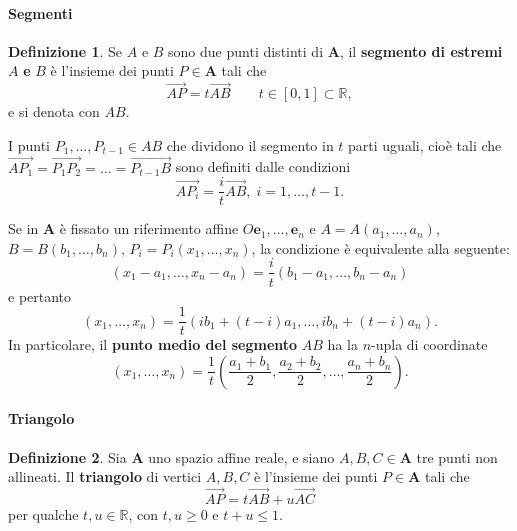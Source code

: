 \documentclass{article}
\theoremstyle{plain}
\theoremstyle{definition}
\newtheorem{defn}{Definizione}[section]
\theoremstyle{remark}
\begin{document}
\vspace{10pt}

\paragraph{Segmenti}
\begin{bxthm}
\begin{defn}
    Se $A$ e $B$ sono due punti distinti di $\mathbf{A}$, il \textbf{segmento di estremi} $A$ \textbf{e} $B$ è l'insieme dei punti $P\in \mathbf{A}$ tali che 
    \[\overrightarrow{AP}=t\overrightarrow{AB}\quad\quad t\in[0,1]\subset\mathbb{R},\]
    e si denota con $AB$.
\end{defn}
\end{bxthm}

\vspace{10pt}

I punti $P_1,\ldots,P_{t-1}\in AB$ che dividono il segmento in $t$ parti uguali, cioè tali che $\overrightarrow{AP_1}=\overrightarrow{P_1P_2}=\ldots=\overrightarrow{P_{t-1}B}$ sono definiti dalle condizioni
\[\overrightarrow{AP_i}=\frac{i}{t}\overrightarrow{AB},\;i=1,\ldots,t-1.\]

\vspace{10pt}

Se in $\mathbf{A}$ è fissato un riferimento affine $O\mathbf{e}_1,\ldots,\mathbf{e}_n$ e $A=A(a_1,\ldots,a_n)$, $B=B(b_1,\ldots,b_n)$, $P_i=P_i(x_1,\ldots,x_n)$, la condizione 
è equivalente alla seguente: \[(x_1-a_1,\ldots,x_n-a_n)=\frac{i}{t}(b_1-a_1,\ldots,b_n-a_n)\] e pertanto 
\[(x_1,\ldots,x_n)=\frac{1}{t}(ib_1+(t-i)a_1,\ldots,ib_n+(t-i)a_n).\]
In particolare, il \textbf{punto medio del segmento} $AB$ ha la $n$-upla di coordinate
\[(x_1,\ldots,x_n)=\frac{1}{t}\left(\frac{a_1+b_1}{2},\frac{a_2+b_2}{2},\ldots,\frac{a_n+b_n}{2}\right).\]

\vspace{10pt}

\paragraph{Triangolo}
\begin{bxthm}
\begin{defn}
Sia $\mathbf{A}$ uno spazio affine reale, e siano $A,B,C\in\mathbf{A}$ tre punti non allineati. 
Il \textbf{triangolo} di vertici $A, B, C$ è l'insieme dei punti $P\in\mathbf{A}$ tali che 
\[\overrightarrow{AP}=t\overrightarrow{AB}+u\overrightarrow{AC}\]
per qualche $t,u\in\mathbb{R}$, con $t,u\geq0$ e $t+u\leq1$.
\end{defn}
\end{bxthm}
\end{document}
